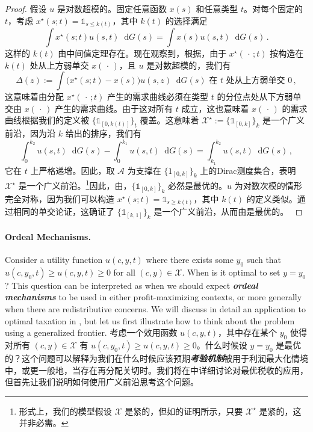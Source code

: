 \documentclass[12pt,letterpaper]{article}
\newenvironment{original}{\color{black}\noindent}{}
\newenvironment{translation}{\color{blue}\noindent}{}
\theoremstyle{plain}
\theoremstyle{definition}
\theoremstyle{remark}
\renewcommand{\1}{\mathds{1}}
\renewcommand*\d{\mathop{}\!\mathrm{d}}
\newcommand{\X}{\mathcal{X}}
\theoremstyle{definition}
\begin{document}
\begin{proof}
\begin{original}
\end{original}
\begin{translation}
假设 $u$ 是对数超模的。固定任意函数 $x(s)$ 和任意类型 $t$。对每个固定的 $t$，考虑 $x^\star(s; t) = \1_{s \leq k(t)}$，其中 $k(t)$ 的选择满足
\[\int x^\star(s; t) u(s, t) \d G(s)= \int x(s) u(s, t) \d G(s) \,.\]
这样的 $k(t)$ 由中间值定理存在。现在观察到，根据\citet{karlin1956theory}，由于 $x^\star(\,\cdot\,; t)$ 按构造在 $k(t)$ 处从上方弱单交 $x(\,\cdot\,)$，且 $u$ 是对数超模的，我们有
\[\Delta(z):= \int \big(x^\star(s; t) - x(s)\big) u(s, z) \d G(s) \text{ 在 $t$ 处从上方弱单交 $0$}\,, \]
这意味着由分配 $x^\star(\,\cdot\,; t)$ 产生的需求曲线必须在类型 $t$ 的分位点处从下方弱单交由 $x(\,\cdot\,)$ 产生的需求曲线。由于这对所有 $t$ 成立，这也意味着 $x(\,\cdot\,)$ 的需求曲线根据我们的定义被 $\{\1_{[0, k(t)]}\}_{t}$ 覆盖。这意味着 $\X^\star:=  \{\1_{[0, k]}\}_{k}$ 是一个广义前沿，因为沿 $k$ 给出的排序，我们有
\[\int^{k_2}_0 u(s, t) \d G(s) - \int^{k_1}_0 u(s, t) \d G(s)  = \int_{k_1}^{k_2} u(s, t) \d G(s)\,,\]
它在 $t$ 上严格递增。因此，取 $\mathcal{A}$ 为支撑在 $\{1_{[0, k]}\}_{k}$ 上的Dirac测度集合，表明 $\X^\star$ 是一个广义前沿。\footnote{形式上，我们的模型假设 $\X$ 是紧的，但如的证明所示，只要 $\X^\star$ 是紧的，这并非必需。}因此，由，$\{\1_{[0, k]}\}_{k}$ 必然是最优的。$u$ 为对数次模的情形完全对称，因为我们可以构造 $x^\star(s; t) = \1_{s \geq k(t)}$，其中 $k(t)$ 的定义类似。通过相同的单交论证，这确证了 $\{\1_{[k, 1]}\}_k$ 是一个广义前沿，从而由是最优的。
\end{translation}
\end{proof}

\paragraph{Ordeal Mechanisms.}\hspace{-2mm}\begin{original}Consider a utility function $u(c, y, t)$ where there exists some $y_0$ such that $u(c, y_0, t) \geq u(c, y, t) \geq 0$ for all $(c, y) \in \mathcal{X}$. When is it optimal to set $y = y_0$? This question can be interpreted as when we should expect \textit{\textbf{ordeal mechanisms}} to be used in either profit-maximizing contexts, or more generally when there are redistributive concerns. We will discuss in detail an application to optimal taxation in , but let us first illustrate how to think about the problem using a generalized frontier.
\end{original}
\begin{translation}
考虑一个效用函数 $u(c, y, t)$，其中存在某个 $y_0$ 使得对所有 $(c, y) \in \mathcal{X}$ 有 $u(c, y_0, t) \geq u(c, y, t) \geq 0$。什么时候设 $y = y_0$ 是最优的？这个问题可以解释为我们在什么时候应该预期\textit{\textbf{考验机制}}被用于利润最大化情境中，或更一般地，当存在再分配关切时。我们将在中详细讨论对最优税收的应用，但首先让我们说明如何使用广义前沿思考这个问题。
\end{translation}
\end{document}
